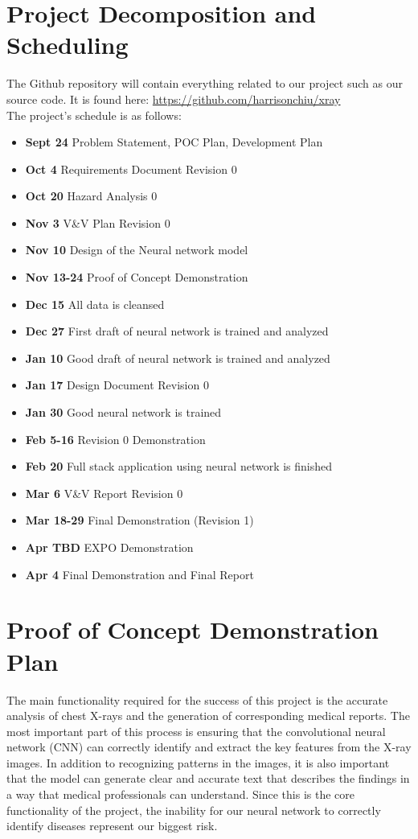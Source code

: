 \documentclass{article}
\begin{document}
\section{Project Decomposition and Scheduling}

The Github repository will contain everything related to our project such as our source code.
It is found here: \url{https://github.com/harrisonchiu/xray}\\

The project's schedule is as follows:
\begin{itemize}
  \item \textbf{Sept 24} Problem Statement, POC Plan, Development Plan
  \item \textbf{Oct 4} Requirements Document Revision 0
  \item \textbf{Oct 20} Hazard Analysis 0
  \item \textbf{Nov 3} V\&V Plan Revision 0
  \item \textbf{Nov 10} Design of the Neural network model
  \item \textbf{Nov 13-24} Proof of Concept Demonstration
  \item \textbf{Dec 15} All data is cleansed
  \item \textbf{Dec 27} First draft of neural network is trained and analyzed
  \item \textbf{Jan 10} Good draft of neural network is trained and analyzed
  \item \textbf{Jan 17} Design Document Revision 0
  \item \textbf{Jan 30} Good neural network is trained
  \item \textbf{Feb 5-16} Revision 0 Demonstration
  \item \textbf{Feb 20} Full stack application using neural network is finished
  \item \textbf{Mar 6} V\&V Report Revision 0
  \item \textbf{Mar 18-29} Final Demonstration (Revision 1)
  \item \textbf{Apr TBD} EXPO Demonstration
  \item \textbf{Apr 4} Final Demonstration and Final Report
\end{itemize}

\section{Proof of Concept Demonstration Plan}

The main functionality required for the success of this project is the accurate
analysis of chest X-rays and the generation of corresponding medical reports.
The most important part of this process is ensuring that the convolutional 
neural network (CNN) can correctly identify and extract the key features from
the X-ray images. In addition to recognizing patterns in the images, it is
also important that the model can generate clear and accurate text that 
describes the findings in a way that medical professionals can understand.
Since this is the core functionality of the project, the inability for our
neural network to correctly identify diseases represent our biggest risk.
\end{document}
